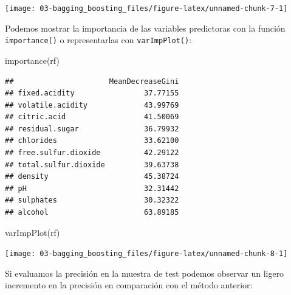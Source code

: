 \documentclass[
]{book}
\newenvironment{Shaded}{\begin{snugshade}}{\end{snugshade}}
\newcommand{\AttributeTok}[1]{\textcolor[rgb]{0.77,0.63,0.00}{#1}}
\newcommand{\FunctionTok}[1]{\textcolor[rgb]{0.00,0.00,0.00}{#1}}
\newcommand{\NormalTok}[1]{#1}
\newcommand{\OtherTok}[1]{\textcolor[rgb]{0.56,0.35,0.01}{#1}}
\newcommand{\SpecialCharTok}[1]{\textcolor[rgb]{0.00,0.00,0.00}{#1}}
\theoremstyle{break}
\theoremstyle{definition}
\theoremstyle{definition}
\theoremstyle{definition}
\theoremstyle{definition}
\theoremstyle{remark}
\begin{document}
\begin{center}\texttt{[image: 03-bagging\_boosting\_files/figure-latex/unnamed-chunk-7-1]} \end{center}

Podemos mostrar la importancia de las variables predictoras con la función \texttt{importance()} o representarlas con \texttt{varImpPlot()}:

\begin{Shaded}
\begin{Highlighting}[]
\FunctionTok{importance}\NormalTok{(rf)}
\end{Highlighting}
\end{Shaded}

\begin{verbatim}
##                      MeanDecreaseGini
## fixed.acidity                37.77155
## volatile.acidity             43.99769
## citric.acid                  41.50069
## residual.sugar               36.79932
## chlorides                    33.62100
## free.sulfur.dioxide          42.29122
## total.sulfur.dioxide         39.63738
## density                      45.38724
## pH                           32.31442
## sulphates                    30.32322
## alcohol                      63.89185
\end{verbatim}

\begin{Shaded}
\begin{Highlighting}[]
\FunctionTok{varImpPlot}\NormalTok{(rf)}
\end{Highlighting}
\end{Shaded}

\begin{center}\texttt{[image: 03-bagging\_boosting\_files/figure-latex/unnamed-chunk-8-1]} \end{center}

Si evaluamos la precisión en la muestra de test podemos observar un ligero incremento en la precisión en comparación con el método anterior:

\begin{Shaded}
\end{Shaded}
\end{document}
